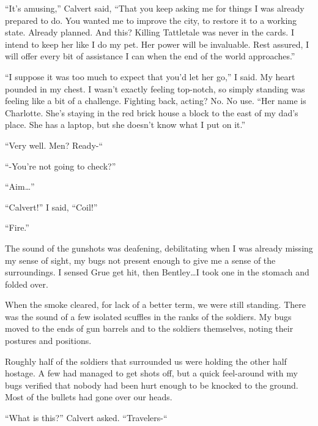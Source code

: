 ``It's amusing,'' Calvert said, ``That you keep asking me for things I was already prepared to do.  You wanted me to improve the city, to restore it to a working state.  Already planned.  And this?  Killing Tattletale was never in the cards.  I intend to keep her like I do my pet.  Her power will be invaluable.  Rest assured, I will offer every bit of assistance I can when the end of the world approaches.''



``I suppose it was too much to expect that you'd let her go,'' I said.  My heart pounded in my chest.  I wasn't exactly feeling top-notch, so simply standing was feeling like a bit of a challenge.  Fighting back, acting?  No.  No use.  ``Her name is Charlotte.  She's staying in the red brick house a block to the east of my dad's place.  She has a laptop, but she doesn't know what I put on it.''



``Very well.  Men?  Ready-``



``-You're not going to check?''



``Aim\ldots''



``Calvert!'' I said, ``Coil!''



``Fire.''



The sound of the gunshots was deafening, debilitating when I was already missing my sense of sight, my bugs not present enough to give me a sense of the surroundings.  I sensed Grue get hit, then Bentley\ldots I took one in the stomach and folded over.



When the smoke cleared, for lack of a better term, we were still standing.  There was the sound of a few isolated scuffles in the ranks of the soldiers.  My bugs moved to the ends of gun barrels and to the soldiers themselves, noting their postures and positions.



Roughly half of the soldiers that surrounded us were holding the other half hostage.  A few had managed to get shots off, but a quick feel-around with my bugs verified that nobody had been hurt enough to be knocked to the ground.  Most of the bullets had gone over our heads.



``What is this?'' Calvert asked.  ``Travelers-``



